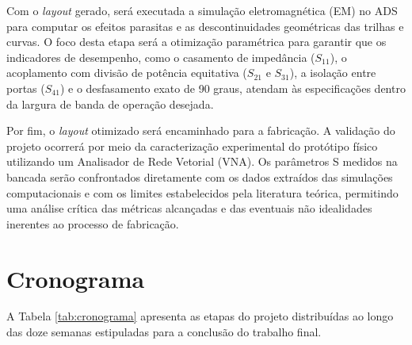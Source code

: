 \documentclass[article, oneside, oldfontcommands]{abntex2}
\begin{document}
Com o \textit{layout} gerado, será executada a simulação eletromagnética (EM) no ADS para computar os efeitos parasitas e as descontinuidades geométricas das trilhas e curvas. O foco desta etapa será a otimização paramétrica para garantir que os indicadores de desempenho, como o casamento de impedância ($S_{11}$), o acoplamento com divisão de potência equitativa ($S_{21}$ e $S_{31}$), a isolação entre portas ($S_{41}$) e o desfasamento exato de 90 graus, atendam às especificações dentro da largura de banda de operação desejada.

Por fim, o \textit{layout} otimizado será encaminhado para a fabricação. A validação do projeto ocorrerá por meio da caracterização experimental do protótipo físico utilizando um Analisador de Rede Vetorial (VNA). Os parâmetros S medidos na bancada serão confrontados diretamente com os dados extraídos das simulações computacionais e com os limites estabelecidos pela literatura teórica, permitindo uma análise crítica das métricas alcançadas e das eventuais não idealidades inerentes ao processo de fabricação. 

\section{Cronograma}

A Tabela \ref{tab:cronograma} apresenta as etapas do projeto distribuídas ao longo das doze semanas estipuladas para a conclusão do trabalho final.
\end{document}
